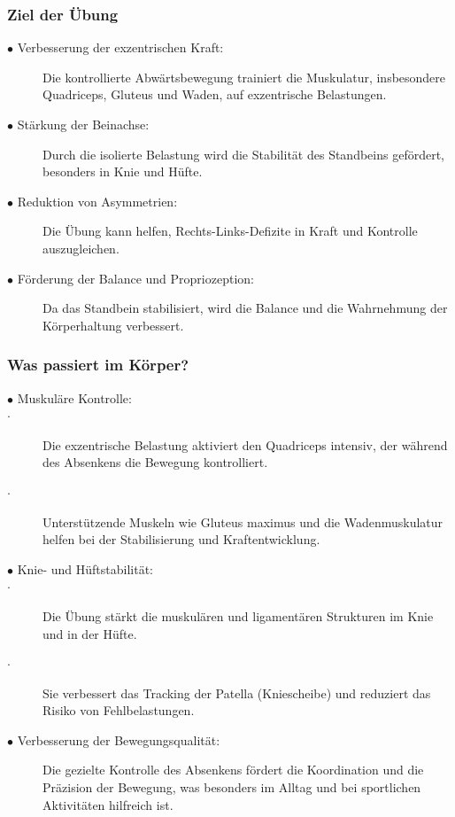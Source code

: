 \subsubsection{Ziel der Übung}

\begin{description}
    \item[$\bullet$ Verbesserung der exzentrischen Kraft:] Die kontrollierte Abwärtsbewegung trainiert die Muskulatur, insbesondere Quadriceps, Gluteus und Waden, auf exzentrische Belastungen.
    \item[$\bullet$ Stärkung der Beinachse:] Durch die isolierte Belastung wird die Stabilität des Standbeins gefördert, besonders in Knie und Hüfte.
    \item[$\bullet$ Reduktion von Asymmetrien:]  Die Übung kann helfen, Rechts-Links-Defizite in Kraft und Kontrolle auszugleichen.
    \item[$\bullet$ Förderung der Balance und Propriozeption: ] Da das Standbein stabilisiert, wird die Balance und die Wahrnehmung der Körperhaltung verbessert.
\end{description}

\subsubsection{Was passiert im Körper?}

\begin{description}
    \item[$\bullet$ Muskuläre Kontrolle:]

    \item[$\cdot$] Die exzentrische Belastung aktiviert den Quadriceps intensiv, der während des Absenkens die Bewegung kontrolliert.
    \item[$\cdot$] Unterstützende Muskeln wie Gluteus maximus und die Wadenmuskulatur helfen bei der Stabilisierung und Kraftentwicklung.

    \item[$\bullet$ Knie- und Hüftstabilität:]
        \item[$\cdot$]Die Übung stärkt die muskulären und ligamentären Strukturen im Knie und in der Hüfte.
        \item[$\cdot$]Sie verbessert das Tracking der Patella (Kniescheibe) und reduziert das Risiko von Fehlbelastungen.
    \item[$\bullet$ Verbesserung der Bewegungsqualität:] Die gezielte Kontrolle des Absenkens fördert die Koordination und die Präzision der Bewegung, was besonders im Alltag und bei sportlichen Aktivitäten hilfreich ist.

\end{description}

